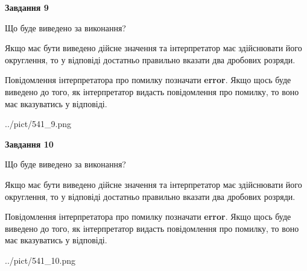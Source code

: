 \documentclass[12pt, ukrainian]{article}
\begin{document}
{\begin {Large}
{\begin {center}\textbf{Завдання 9}\end {center}}\par
Що буде виведено за виконання? \par

Якщо має бути виведено дійсне значення та інтерпретатор має здійснювати його округлення, 
то у відповіді достатньо правильно вказати два дробових розряди.

Повідомлення інтерпретатора про помилку позначати \textbf{error}.
Якщо щось буде виведено до того, як інтерпретатор видасть повідомлення про помилку, 
то воно має вказуватись у відповіді. \par

\begin{center}
	{../pict/541_9.png}
\end{center}
\newpage

{\begin {center}\textbf{Завдання 10}\end {center}}\par
Що буде виведено за виконання? \par

Якщо має бути виведено дійсне значення та інтерпретатор має здійснювати його округлення, 
то у відповіді достатньо правильно вказати два дробових розряди.

Повідомлення інтерпретатора про помилку позначати \textbf{error}.
Якщо щось буде виведено до того, як інтерпретатор видасть повідомлення про помилку, 
то воно має вказуватись у відповіді. \par

\begin{center}
	{../pict/541_10.png}
\end{center}
\newpage

\end {Large}}
\end{document}
